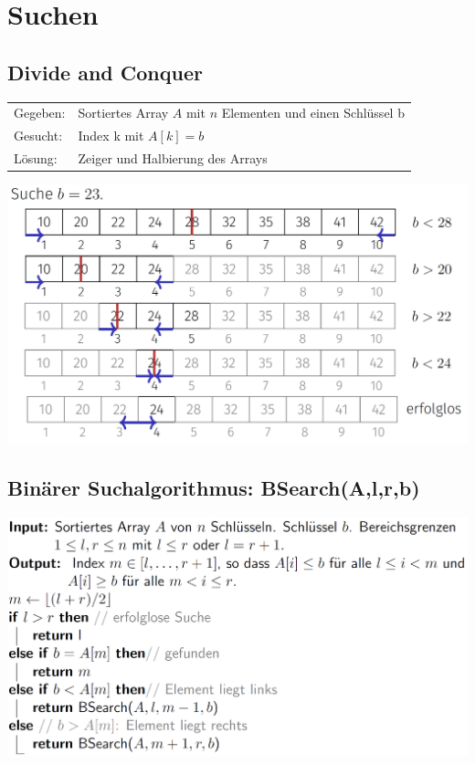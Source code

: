 \section{Suchen}

\begin{sectionbox}
\subsection{Divide and Conquer}\smallskip
\begin{tabular*}{\columnwidth}{@{\extracolsep\fill}ll@{}}
Gegeben: & Sortiertes Array $A$ mit $n$ Elementen und einen Schlüssel b \\
Gesucht: & Index k mit $A[k]=b$ \\
Lösung: & Zeiger und Halbierung des Arrays\\
\end{tabular*}

\begin{center}
    \includegraphics[width = 0.6\columnwidth]{../img/DaQ.png}
\end{center}\par\smallskip
\end{sectionbox}
\begin{sectionbox}
\subsection{Binärer Suchalgorithmus: BSearch(A,l,r,b)}\smallskip
\begin{center}
    \includegraphics[width = \columnwidth]{../img/BSearch.png}
\end{center}\par\smallskip
\end{sectionbox}